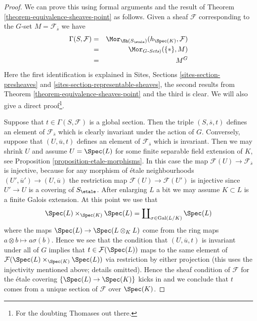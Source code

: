 \begin{proof}
We can prove this using formal arguments and the result of
Theorem \ref{theorem-equivalence-sheaves-point}
as follows. Given a sheaf $\mathcal{F}$ corresponding to
the $G$-set $M = \mathcal{F}_{\overline{s}}$ we have
\begin{eqnarray*}
\Gamma(S, \mathcal{F}) & = &
\Mor_{\Sh(S_\etale)}(h_{\Spec(K)},  \mathcal{F})
\\
& = & \Mor_{G\textit{-Sets})}(\{*\}, M) \\
& = & M^G
\end{eqnarray*}
Here the first identification is explained in
Sites, Sections \ref{sites-section-presheaves} and
\ref{sites-section-representable-sheaves},
the second results from
Theorem \ref{theorem-equivalence-sheaves-point}
and the third is clear. We will also give a direct proof\footnote{For
the doubting Thomases out there.}.

\medskip\noindent
Suppose that $t \in \Gamma(S, \mathcal{F})$ is a global section.
Then the triple $(S, \overline{s}, t)$ defines an element of
$\mathcal{F}_{\overline{s}}$ which is clearly invariant under the
action of $G$. Conversely, suppose that $(U, \overline{u}, t)$
defines an element of $\mathcal{F}_{\overline{s}}$ which is invariant.
Then we may shrink $U$ and assume $U = \Spec(L)$ for some
finite separable field extension of $K$, see
Proposition \ref{proposition-etale-morphisms}.
In this case the map $\mathcal{F}(U) \to \mathcal{F}_{\overline{s}}$
is injective, because for any morphism of \'etale neighbourhoods
$(U', \overline{u}') \to (U, \overline{u})$ the restriction map
$\mathcal{F}(U) \to \mathcal{F}(U')$ is injective since $U' \to U$
is a covering of $S_\etale$.
After enlarging $L$ a bit we may assume $K \subset L$ is a finite
Galois extension. At this point we use that
$$
\Spec(L) \times_{\Spec(K)} \Spec(L)
=
\coprod\nolimits_{\sigma \in \text{Gal}(L/K)} \Spec(L)
$$
where the maps $\Spec(L) \to \Spec(L \otimes_K L)$
come from the ring maps $a \otimes b \mapsto a\sigma(b)$. Hence we
see that the condition that $(U, \overline{u}, t)$ is invariant
under all of $G$ implies that $t \in \mathcal{F}(\Spec(L))$
maps to the same element of
$\mathcal{F}(\Spec(L) \times_{\Spec(K)} \Spec(L))$
via restriction by either projection (this uses the injectivity mentioned
above; details omitted). Hence the sheaf condition of $\mathcal{F}$
for the \'etale covering $\{\Spec(L) \to \Spec(K)\}$ kicks
in and we conclude that $t$ comes from a unique section of $\mathcal{F}$
over $\Spec(K)$.
\end{proof}

